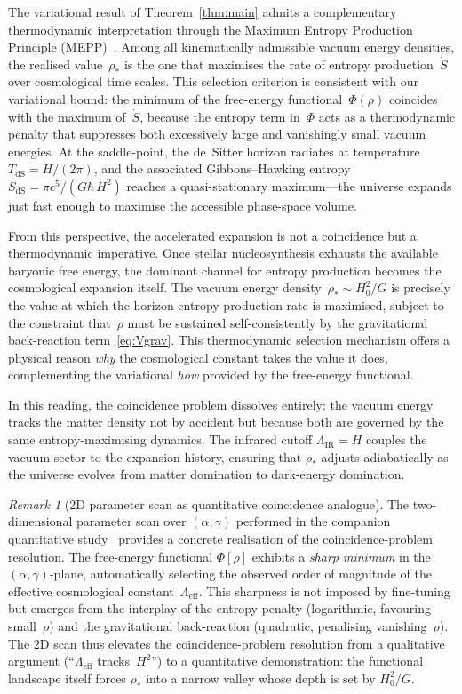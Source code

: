 \documentclass[12pt,a4paper]{article}
\theoremstyle{definition}
\theoremstyle{plain}
\theoremstyle{remark}
\newtheorem{remark}[definition]{Remark}
\newcommand{\LIR}{\Lambda_{\mathrm{IR}}}
\begin{document}
The variational result of Theorem~\ref{thm:main} admits a complementary thermodynamic interpretation through the Maximum Entropy Production Principle (MEPP)~\cite{MartyushevSeleznev2006}. Among all kinematically admissible vacuum energy densities, the realised value~$\rho_\ast$ is the one that maximises the rate of entropy production~$\dot{S}$ over cosmological time scales. This selection criterion is consistent with our variational bound: the minimum of the free-energy functional~$\Phi(\rho)$ coincides with the maximum of~$\dot{S}$, because the entropy term in~$\Phi$ acts as a thermodynamic penalty that suppresses both excessively large and vanishingly small vacuum energies. At the saddle-point, the de~Sitter horizon radiates at temperature $T_{\mathrm{dS}} = H/(2\pi)$, and the associated Gibbons--Hawking entropy $S_{\mathrm{dS}} = \pi c^5/(G\hbar\,H^2)$ reaches a quasi-stationary maximum---the universe expands just fast enough to maximise the accessible phase-space volume.

From this perspective, the accelerated expansion is not a coincidence but a thermodynamic imperative. Once stellar nucleosynthesis exhausts the available baryonic free energy, the dominant channel for entropy production becomes the cosmological expansion itself. The vacuum energy density~$\rho_\ast \sim H_0^2/G$ is precisely the value at which the horizon entropy production rate is maximised, subject to the constraint that~$\rho$ must be sustained self-consistently by the gravitational back-reaction term~\eqref{eq:Vgrav}. This thermodynamic selection mechanism offers a physical reason \emph{why} the cosmological constant takes the value it does, complementing the variational \emph{how} provided by the free-energy functional.

In this reading, the coincidence problem dissolves entirely: the vacuum energy tracks the matter density not by accident but because both are governed by the same entropy-maximising dynamics. The infrared cutoff $\LIR = H$ couples the vacuum sector to the expansion history, ensuring that $\rho_\ast$ adjusts adiabatically as the universe evolves from matter domination to dark-energy domination.

\begin{remark}[2D parameter scan as quantitative coincidence analogue]
\label{rem:2d-scan-coincidence}
The two-dimensional parameter scan over $(\alpha, \gamma)$ performed
in the companion quantitative study~\cite{FST-Unified2026} provides
a concrete realisation of the coincidence-problem resolution.
The free-energy functional $\Phi[\rho]$ exhibits a \emph{sharp minimum}
in the $(\alpha, \gamma)$-plane, automatically selecting the observed
order of magnitude of the effective cosmological constant~$\Lambda_{\mathrm{eff}}$.
This sharpness is not imposed by fine-tuning but emerges from the
interplay of the entropy penalty (logarithmic, favouring small~$\rho$)
and the gravitational back-reaction (quadratic, penalising
vanishing~$\rho$).  The 2D scan thus elevates the coincidence-problem
resolution from a qualitative argument (``$\Lambda_{\mathrm{eff}}$
tracks~$H^2$'') to a quantitative demonstration: the functional
landscape itself forces $\rho_\ast$ into a narrow valley whose depth
is set by $H_0^2/G$.
\end{remark}
\end{document}
